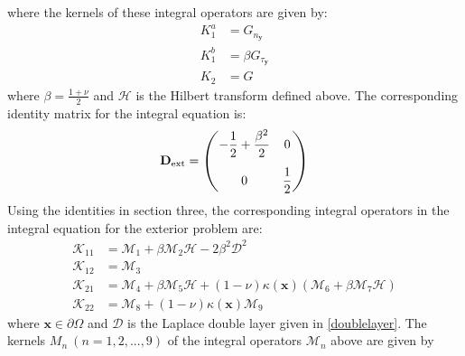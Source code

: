 \documentclass[preprint,12pt,3p]{elsarticle}
\begin{document}
where the kernels of these integral operators are given by:
\begin{align}
    K^a_{1}  &= G_{n_\mathbf{y}}\\
    K^b_{1} &= \beta G_{\tau_\mathbf{y}} \\
    K_{2} &= G
\end{align}
where $\beta = \displaystyle \frac{1+\nu}{2}$ and $\mathcal{H}$ is the Hilbert transform defined above. The corresponding identity matrix for the integral equation is:
\begin{align}
    \mathbf{D}_{\rm ext} = \begin{pmatrix}
        \vspace{0.3cm} \displaystyle-\frac{1}{2} + \frac{\beta^2}{2} & 0 \\ 0  & \displaystyle\frac{1}{2} 
    \end{pmatrix} \label{free_id}
\end{align}
Using the identities in section three, the corresponding integral operators in the integral equation for the exterior problem are:
\begin{align}
    \mathcal{K}_{11}  &= \mathcal{M}_{1} + \beta \mathcal{M}_{2} \mathcal{H}  - 2  \beta^2 \mathcal{D}^2 \\ 
    \mathcal{K}_{12} &=\mathcal{M}_{3}\\
    \mathcal{K}_{21} &= \mathcal{M}_{4} 
    + \beta \mathcal{M}_{5} \mathcal{H} + (1-\nu) \kappa(\mathbf{x}) \left( \mathcal{M}_{6} +  \beta \mathcal{M}_{7} \mathcal{H} \right)  \\
    \mathcal{K}_{22} &= \mathcal{M}_{8}  + (1-\nu) \kappa(\mathbf{x}) \mathcal{M}_{9}\label{last_free_ker}
\end{align}
where $\mathbf{x}\in \partial \Omega$ and $\mathcal{D}$ is the Laplace double layer given in \eqref{doublelayer}. The kernels $M_{n} \ (n = 1,2,...,9)$ of the integral operators $\mathcal{M}_n$ above are given by 
\end{document}
